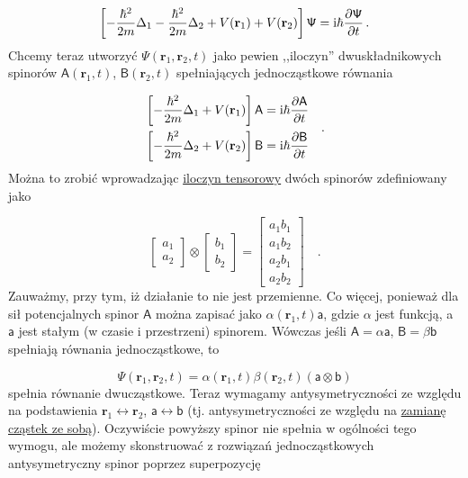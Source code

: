 \documentclass{myclass}
\begin{document}
\begin{equation*}
\left[-\frac{\hbar^2}{2m}\Delta_1-\frac{\hbar^2}{2m}\Delta_2+V(\mathbf{r}_1)+V(\mathbf{r}_2)\right]\mathsf{\Psi}=\mathrm{i}\hbar\pdv{\mathsf{\Psi}}{t}\,.
\end{equation*}
Chcemy teraz utworzyć \(\mathsf{\Psi}(\mathbf{r}_1,\mathbf{r}_2,t)\) jako pewien ,,iloczyn''
dwuskładnikowych spinorów \(\mathsf{A}(\mathbf{r}_1,t)\), \(\mathsf{B}(\mathbf{r}_2,t)\)
spełniających jednocząstkowe równania

\begin{equation*}
\begin{split}
    &\left[-\frac{\hbar^2}{2m}\Delta_1+V(\mathbf{r}_1)\right]\mathsf{A}=\mathrm{i}\hbar\pdv{\mathsf{A}}{t}\\
    &\left[-\frac{\hbar^2}{2m}\Delta_2+V(\mathbf{r}_2)\right]\mathsf{B}=\mathrm{i}\hbar\pdv{\mathsf{B}}{t}
\end{split}\quad.
\end{equation*}
Można to zrobić wprowadzając \underline{iloczyn tensorowy} dwóch spinorów zdefiniowany jako

\begin{equation*}
\begin{bmatrix}
a_1\\a_2
\end{bmatrix}\otimes\begin{bmatrix}
b_1\\b_2
\end{bmatrix}=\begin{bmatrix}
a_1b_1\\
a_1b_2\\
a_2b_1\\
a_2b_2
\end{bmatrix}\quad.
\end{equation*}
Zauważmy, przy tym, iż działanie to nie jest przemienne. Co więcej, ponieważ dla sił potencjalnych
spinor \(\mathsf{A}\) można zapisać jako \(\alpha(\mathbf{r}_1,t)\mathsf{a}\), gdzie \(\alpha\) jest
funkcją, a \(\mathsf{a}\) jest stałym (w czasie i przestrzeni) spinorem. Wówczas jeśli
\(\mathsf{A}=\alpha\mathsf{a}\), \(\mathsf{B}=\beta\mathsf{b}\) spełniają równania jednocząstkowe,
to

\begin{equation*}
\mathsf{\Psi}(\mathbf{r}_1,\mathbf{r}_2,t)=\alpha(\mathbf{r}_1,t)\beta(\mathbf{r}_2,t)(\mathsf{a}\otimes\mathsf{b})
\end{equation*}
spełnia równanie dwucząstkowe. Teraz wymagamy antysymetryczności ze względu na podstawienia
\(\boxed{\mathbf{r}_1\leftrightarrow\mathbf{r}_2}\), \(\boxed{\mathsf{a}\leftrightarrow\mathsf{b}}\)
(tj. antysymetryczności ze względu na \underline{zamianę cząstek ze sobą}). Oczywiście powyższy
spinor nie spełnia w ogólności tego wymogu, ale możemy skonstruować z rozwiązań jednocząstkowych
antysymetryczny spinor poprzez superpozycję
\end{document}
